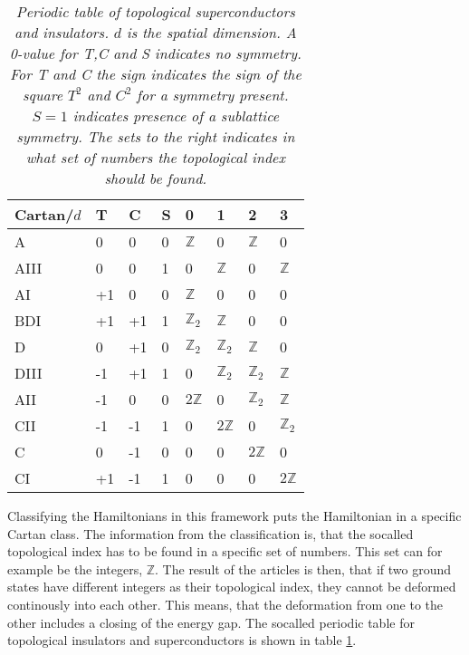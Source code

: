 \begin{table}[htb]
\centering
\caption{\textit{Periodic table of topological superconductors and insulators. $d$ is the spatial dimension. A 0-value for T,C and S indicates no symmetry. For T and C the sign indicates the sign of the square $T^2$ and $C^2$ for a symmetry present. $S=1$ indicates presence of a sublattice symmetry. The sets to the right indicates in what set of numbers the topological index should be found. }}
\begin{tabular}{|l||l l l||l l l l|}
\hline Cartan/$d$   &  T &  C & S					& 0 & 1 & 2 & 3 \\ \hline 
\hline A    		&  0 &  0 & 0					& $\mathbb{Z}$ & 0 & $\mathbb{Z}$ & 0   			 \\
\hline AIII 		&  0 &  0 & 1					& 0 & $\mathbb{Z}$ & 0 & $\mathbb{Z}$   			 \\
\hline AI   		& +1 &  0 & 0					& $\mathbb{Z}$ & 0 & 0 & 0 			    			 \\
\hline BDI	       	& +1 & +1 & 1 					& $\mathbb{Z}_2$ & $\mathbb{Z}$ & 0 & 0 			 \\
\hline D	       	&  0 & +1 & 0 					& $\mathbb{Z}_2$ & $\mathbb{Z}_2$ & $\mathbb{Z}$ & 0 \\
\hline DIII	       	& -1 & +1 & 1 					& 0 & $\mathbb{Z}_2$ & $\mathbb{Z}_2$ & $\mathbb{Z}$ \\
\hline AII	       	& -1 &  0 & 0 				 	& $2\mathbb{Z}$ & 0 & $\mathbb{Z}_2$ & $\mathbb{Z}$  \\
\hline CII	       	& -1 & -1 & 1 					& 0 & $2\mathbb{Z}$ & 0 & $\mathbb{Z}_2$  			 \\
\hline C	       	&  0 & -1 & 0 					& 0 & 0 & $2\mathbb{Z}$ & 0  						 \\
\hline CI	       	& +1 & -1 & 1 					& 0 & 0 & 0 & $2\mathbb{Z}$  						 \\
\hline 
\end{tabular}
\label{tab.PeriodicTableTISC}
\end{table}

Classifying the Hamiltonians in this framework puts the Hamiltonian in a specific Cartan class. The information from the classification is, that the socalled topological index has to be found in a specific set of numbers. This set can for example be the integers, $\mathbb{Z}$. The result of the articles is then, that if two ground states have different integers as their topological index, they cannot be deformed continously into each other. This means, that the deformation from one to the other includes a closing of the energy gap. The socalled periodic table for topological insulators and superconductors is shown in table \ref{tab.PeriodicTableTISC}.


